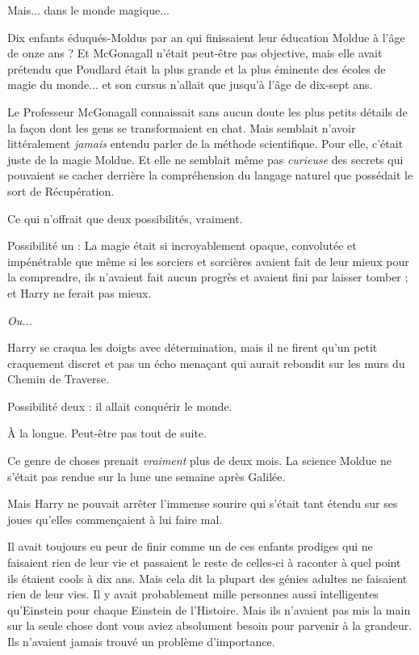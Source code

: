 Mais... dans le monde magique...

Dix enfants éduqués-Moldus par an qui finissaient leur éducation Moldue à l'âge de onze ans ? Et McGonagall n'était peut-être pas objective, mais elle avait prétendu que Poudlard était la plus grande et la plus éminente des écoles de magie du monde... et son cursus n'allait que jusqu'à l'âge de dix-sept ans.

Le Professeur McGonagall connaissait sans aucun doute les plus petits détails de la façon dont les gens se transformaient en chat. Mais semblait n'avoir littéralement \emph{jamais}  entendu parler de la méthode scientifique. Pour elle, c'était juste de la magie Moldue. Et elle ne semblait même pas \emph{curieuse}  des secrets qui pouvaient se cacher derrière la compréhension du langage naturel que possédait le sort de Récupération.

Ce qui n'offrait que deux possibilités, vraiment.

Possibilité un : La magie était si incroyablement opaque, convolutée et impénétrable que même si les sorciers et sorcières avaient fait de leur mieux pour la comprendre, ils n'avaient fait aucun progrès et avaient fini par laisser tomber ; et Harry ne ferait pas mieux.

\emph{Ou...} 

Harry se craqua les doigts avec détermination, mais il ne firent qu'un petit craquement discret et pas un écho menaçant qui aurait rebondit sur les murs du Chemin de Traverse.

Possibilité deux : il allait conquérir le monde.

À la longue. Peut-être pas tout de suite.

Ce genre de choses prenait \emph{vraiment}  plus de deux mois. La science Moldue ne s'était pas rendue sur la lune une semaine après Galilée.

Mais Harry ne pouvait arrêter l'immense sourire qui s'était tant étendu sur ses joues qu'elles commençaient à lui faire mal.

Il avait toujours eu peur de finir comme un de ces enfants prodiges qui ne faisaient rien de leur vie et passaient le reste de celles-ci à raconter à quel point ils étaient cools à dix ans. Mais cela dit la plupart des génies adultes ne faisaient rien de leur vies. Il y avait probablement mille personnes aussi intelligentes qu'Einstein pour chaque Einstein de l'Histoire. Mais ils n'avaient pas mis la main sur la seule chose dont vous aviez absolument besoin pour parvenir à la grandeur. Ils n'avaient jamais trouvé un problème d'importance.


